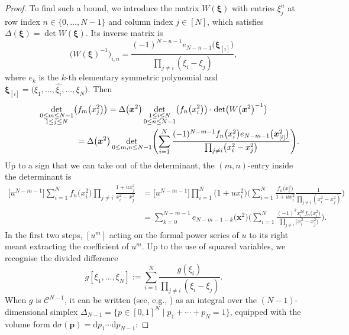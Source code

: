 \documentclass[10pt,a4paper]{amsart}
\numberwithin{equation}{section}
\newcommand{\dd}{\mathrm{d}}
\begin{document}
\begin{proof}
To find such a bound, we introduce the matrix $W(\boldsymbol{\xi})$ with entries $\xi_j^{n}$ at row index $n \in \{0,\dots,N - 1\}$ and column index $j \in [N]$, which satisfies $\Delta(\boldsymbol{\xi}) = \det W(\boldsymbol{\xi})$. Its inverse matrix is
\[
\bigl(W(\boldsymbol{\xi})^{-1}\bigr)_{i,n} = \frac{(-1)^{N - n - 1}e_{N - n - 1}\bigl(\boldsymbol{\xi}_{[i]}\bigr)}{\prod_{j \neq i} (\xi_i - \xi_j)},
\]
where $e_k$ is the $k$-th elementary symmetric polynomial and $\boldsymbol{\xi}_{[i]} = \bigl(\xi_1,\dots,\widehat{\xi_i},\dots,\xi_N\bigr)$. Then
\begin{gather}
\nonumber \mathop{\det}_{\substack{0 \leq m \leq N - 1 \\ 1 \leq j \leq N }} \bigl(f_m\bigl(x_j^2\bigr)\bigr) = \Delta\bigl(\boldsymbol{x}^2\bigr) \det_{\substack{1 \leq i \leq N \\ 0 \leq n \leq N - 1}} \bigl(f_n\bigl(x_i^2\bigr)\bigr) \cdot \det \bigl(W\bigl(\boldsymbol{x}^2\bigr)^{-1}\bigr) \\
\hphantom{\mathop{\det}_{\substack{0 \leq m \leq N - 1 \\ 1 \leq j \leq N }} \bigl(f_m\bigl(x_j^2\bigr)\bigr)}{} = \Delta\bigl(\boldsymbol{x}^2\bigr) \det_{0 \leq m,n \leq N - 1} \Biggl(\sum_{i = 1}^{N} \frac{(-1)^{N - m - 1} f_n\bigl(x_i^2\bigr) e_{N - m - 1}\bigl(\boldsymbol{x}^2_{[i]}\bigr)}{\prod_{j \neq i} \bigl(x_i^2 - x_j^2\bigr)}\Biggr).\label{26}
\end{gather}
Up to a sign that we can take out of the determinant, the $(m,n)$-entry inside the determinant is
\begin{align*}
 \bigl[u^{N - m - 1}\bigr] \sum_{i = 1}^N f_n\bigl(x_i^2\bigr) \prod_{j \neq i} \frac{1 + ux_j^2}{x_i^2 - x_j^2} & = \bigl[u^{N - m - 1}\bigr] \prod_{i = 1}^N \bigl(1 + ux_i^2\bigr)\!\Biggl( \sum_{i = 1}^N \frac{f_n\bigl(x_i^2\bigr)}{1 + ux_i^2} \frac{1}{\prod_{j \neq i} (x_i^2 - x_j^2)}\Biggr) \\
& = \sum_{k = 0}^{N - m - 1} e_{N - m - 1 - k}\bigl(\boldsymbol{x}^2\bigr)\!\Biggl( \sum_{i = 1}^{N} \frac{(-1)^k x_i^{2k} f_{n}\bigl(x_i^2\bigr)}{\prod_{j \neq i} \bigl(x_i^2 - x_j^2\bigr)}\Biggr).
\end{align*}
In the first two steps, $[u^m]$ acting on the formal power series of $u$ to its right meant extracting the coefficient of $u^m$. Up to the use of squared variables, we recognise the divided difference
\[
g[\xi_1,\dots,\xi_N] := \sum_{i = 1}^N \frac{g(\xi_i)}{\prod_{j \neq i} (\xi_i - \xi_j)}.
\]
When $g$ is $\mathcal{C}^{N - 1}$, it can be written (see, e.g., \cite[Theorem 2, p.~250]{AnaN}) as an integral over the $(N - 1)$-dimensional simplex $\Delta_{N - 1} = \{p \in [0,1]^N \mid p_1 + \cdots + p_N = 1\}$, equipped with the volume form $\dd \sigma(\boldsymbol{p}) = \dd p_1 \cdots \dd p_{N - 1}$:

\end{proof}
\end{document}
